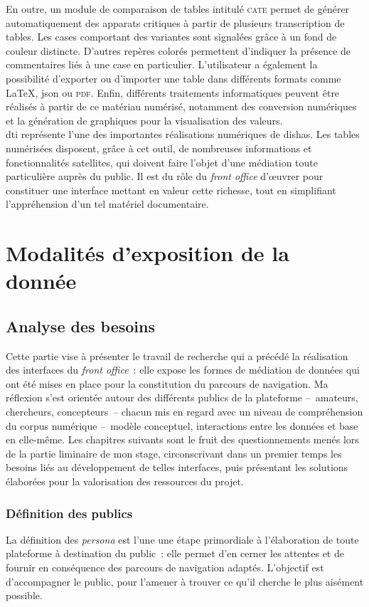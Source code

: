 \documentclass[a4paper,12pt,twoside]{book}
\newcommand{\clearemptydoublepage}{\newpage{\pagestyle{empty}\cleardoublepage}}
\newcommand{\eng}{\emph}
\newcommand{\dishas}{\gls{dishas}\xspace}
\newcommand{\dti}{\gls{dti}\xspace}
\newcommand{\json}{\gls{json}\xspace}
\begin{document}
En outre, un module de comparaison de tables intitulé \textsc{cate} permet de générer automatiquement des apparats critiques à partir de plusieurs transcription de tables. Les cases comportant des variantes sont signalées grâce à un fond de couleur distincte. D'autres repères colorés permettent d'indiquer la présence de commentaires liés à une case en particulier. L'utilisateur a également la possibilité d'exporter ou d'importer une table dans différents formats comme \LaTeX, \json ou \textsc{pdf}. Enfin, différents traitements informatiques peuvent être réalisés à partir de ce matériau numérisé, notamment des conversion numériques et la génération de graphiques pour la visualisation des valeurs.\\

\dti représente l'une des importantes réalisations numériques de \dishas. Les tables numérisées disposent, grâce à cet outil, de nombreuses informations et fonctionnalités satellites, qui doivent faire l'objet d'une médiation toute particulière auprès du public. Il est du rôle du \eng{front office} d'œuvrer pour constituer une interface mettant en valeur cette richesse, tout en simplifiant l'appréhension d'un tel matériel documentaire.

\clearemptydoublepage

\part{Modalités d'exposition de la donnée}
\chapter{Analyse des besoins}
Cette partie vise à présenter le travail de recherche qui a précédé la réalisation des interfaces du \eng{front office}~: elle expose les formes de médiation de données qui ont été mises en place pour la constitution du parcours de navigation. Ma réflexion s'est orientée autour des différents publics de la plateforme –~amateurs, chercheurs, concepteurs~– chacun mis en regard avec un niveau de compréhension du corpus numérique –~modèle conceptuel, interactions entre les données et base en elle-même. Les chapitres suivants sont le fruit des questionnements menés lors de la partie liminaire de mon stage, circonscrivant dans un premier temps les besoins liés au développement de telles interfaces, puis présentant les solutions élaborées pour la valorisation des ressources du projet.

	\section{Définition des publics}
La définition des \eng{persona} est l'une une étape primordiale à l'élaboration de toute plateforme à destination du public~: elle permet d'en cerner les attentes et de fournir en conséquence des parcours de navigation adaptés. L'objectif est d'accompagner le public, pour l'amener à trouver ce qu'il cherche le plus aisément possible.
\end{document}
